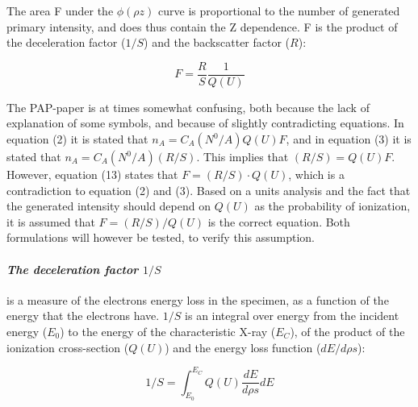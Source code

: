 The area F under the $\phi(\rho z)$ curve is proportional to the number of generated primary intensity, and does thus contain the Z dependence.
F is the product of the deceleration factor ($1/S$) and the backscatter factor ($R$):

\begin{equation}
    F = \frac{R}{S}   \frac{1}{Q(U)}
\end{equation}

The PAP-paper is at times somewhat confusing, both because the lack of explanation of some symbols, and because of slightly contradicting equations.
In equation (2) it is stated that $n_A = C_A (N^0/A) Q(U) F$, and in equation (3) it is stated that $n_A = C_A (N^0/A) (R/S)$.
This implies that $(R/S) = Q(U) F$.
However, equation (13) states that $F = (R/S) \cdot Q(U)$, which is a contradiction to equation (2) and (3).
Based on a units analysis and the fact that the generated intensity should depend on $Q(U)$ as the probability of ionization, it is assumed that $F = (R/S) / Q(U)$ is the correct equation.
Both formulations will however be tested, to verify this assumption.



\paragraph*{\emph{The deceleration factor $1/S$}} is a measure of the electrons energy loss in the specimen, as a function of the energy that the electrons have.
$1/S$ is an integral over energy from the incident energy ($E_0$) to the energy of the characteristic X-ray ($E_C$), of the product of the ionization cross-section ($Q(U)$) and the energy loss function ($dE/d\rho s$):

\begin{equation}
    1/S = \int_{E_0}^{E_C} Q(U)\frac{dE}{d\rho s} dE
\end{equation}

